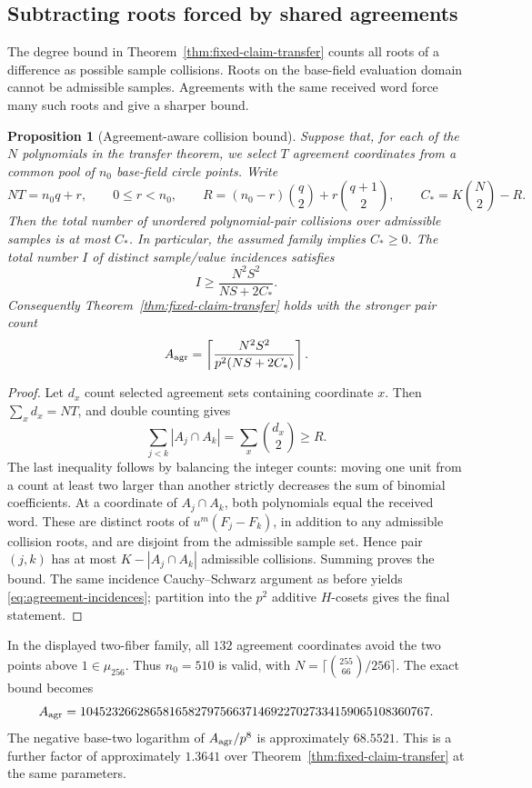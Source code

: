 \documentclass[11pt,letterpaper]{article}
\newtheorem{proposition}[theorem]{Proposition}
\theoremstyle{definition}
\theoremstyle{remark}
\begin{document}
\subsection{Subtracting roots forced by shared agreements}
\label{sec:agreement-collisions}

The degree bound in Theorem~\ref{thm:fixed-claim-transfer} counts all
roots of a difference as possible sample collisions. Roots on the
base-field evaluation domain cannot be admissible samples. Agreements
with the same received word force many such roots and give a sharper
bound.

\begin{proposition}[Agreement-aware collision bound]
\label{prop:agreement-collisions}
Suppose that, for each of the $N$ polynomials in the transfer theorem,
we select $T$ agreement coordinates from a common pool of $n_0$
base-field circle points. Write
\[
 NT=n_0q+r,\qquad 0\le r<n_0,\qquad
 R=(n_0-r)\binom q2+r\binom{q+1}2,
 \qquad C_*=K\binom N2-R.
\]
Then the total number of unordered polynomial-pair collisions over
admissible samples is at most $C_*$. In particular, the assumed family
implies $C_*\ge0$. The total number $I$ of distinct sample/value
incidences satisfies
\begin{equation}\label{eq:agreement-incidences}
 I\ge \frac{N^2S^2}{NS+2C_*}.
\end{equation}
Consequently Theorem~\ref{thm:fixed-claim-transfer} holds with the
stronger pair count
\[
 A_{\rm agr}=\left\lceil\frac{N^2S^2}{p^2(NS+2C_*)}\right\rceil.
\]
\end{proposition}
\begin{proof}
Let $d_x$ count selected agreement sets containing coordinate $x$.
Then $\sum_xd_x=NT$, and double counting gives
\[
 \sum_{j<k}|A_j\cap A_k|=\sum_x\binom{d_x}2\ge R.
\]
The last inequality follows by balancing the integer counts: moving one
unit from a count at least two larger than another strictly decreases
the sum of binomial coefficients. At a coordinate of $A_j\cap A_k$,
both polynomials equal the received word. These are distinct roots of
$u^m(F_j-F_k)$, in addition to any admissible collision roots, and are
disjoint from the admissible sample set. Hence pair $(j,k)$ has at most
$K-|A_j\cap A_k|$ admissible collisions. Summing proves the bound.
The same incidence Cauchy--Schwarz argument as before yields
\eqref{eq:agreement-incidences}; partition into the $p^2$ additive
$H$-cosets gives the final statement.
\end{proof}

In the displayed two-fiber family, all $132$ agreement coordinates
avoid the two points above $1\in\mu_{256}$. Thus $n_0=510$ is valid,
with $N=\lceil\binom{255}{66}/256\rceil$. The exact bound becomes
\[
 A_{\rm agr}=
 1045232662865816582797566371469227027334159065108360767.
\]
The negative base-two logarithm of $A_{\rm agr}/p^8$ is approximately
$68.5521$. This is a further factor of approximately $1.3641$ over
Theorem~\ref{thm:fixed-claim-transfer} at the same parameters.
\end{document}

